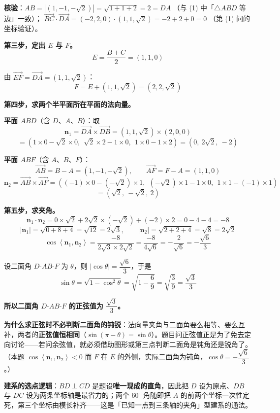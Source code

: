 \textbf{核验}：$AB=\left|\left(1,-1,-\sqrt2\right)\right|=\sqrt{1+1+2}=2=DA$ （与 (1) 中「$\triangle ABD$ 等边」一致）；
$\overrightarrow{BC}\cdot\overrightarrow{DA}=(-2,2,0)\cdot\left(1,1,\sqrt2\right)=-2+2+0=0$ （第 (1) 问的坐标验证）。

\textbf{第三步，定出 $E$ 与 $F$。}
\[E=\frac{B+C}2=(1,1,0)\]

由 $\overrightarrow{EF}=\overrightarrow{DA}=\left(1,1,\sqrt2\right)$：
\[F=E+\left(1,1,\sqrt2\right)=\left(2,2,\sqrt2\right)\]

\textbf{第四步，求两个半平面所在平面的法向量。}

\textbf{平面 $ABD$}（含 $D$、$A$、$B$）：取
\[\boldsymbol n_1=\overrightarrow{DA}\times\overrightarrow{DB}=\left(1,1,\sqrt2\right)\times(2,0,0)\]
\[=\left(1\times0-\sqrt2\times0,\ \ \sqrt2\times2-1\times0,\ \ 1\times0-1\times2\right)=\left(0,\ 2\sqrt2,\ -2\right)\]

\textbf{平面 $ABF$}（含 $A$、$B$、$F$）：
\[\overrightarrow{AB}=B-A=\left(1,-1,-\sqrt2\right),\qquad \overrightarrow{AF}=F-A=(1,1,0)\]
\[\boldsymbol n_2=\overrightarrow{AB}\times\overrightarrow{AF}=\left((-1)\times0-\left(-\sqrt2\right)\times1,\ \ \left(-\sqrt2\right)\times1-1\times0,\ \ 1\times1-(-1)\times1\right)\]
\[=\left(\sqrt2,\ -\sqrt2,\ 2\right)\]

\textbf{第五步，求夹角。}
\[\boldsymbol n_1\cdot\boldsymbol n_2=0\times\sqrt2+2\sqrt2\times\left(-\sqrt2\right)+(-2)\times2=0-4-4=-8\]
\[\left|\boldsymbol n_1\right|=\sqrt{0+8+4}=\sqrt{12}=2\sqrt3,\qquad \left|\boldsymbol n_2\right|=\sqrt{2+2+4}=\sqrt8=2\sqrt2\]
\[\cos\left\langle\boldsymbol n_1,\boldsymbol n_2\right\rangle=\frac{-8}{2\sqrt3\times2\sqrt2}=\frac{-8}{4\sqrt6}=-\frac2{\sqrt6}=-\frac{\sqrt6}3\]

设二面角 $D\text{-}AB\text{-}F$ 为 $\theta$，则 $|\cos\theta|=\dfrac{\sqrt6}3$，于是
\[\sin\theta=\sqrt{1-\cos^{2}\theta}=\sqrt{1-\frac69}=\sqrt{\frac39}=\frac{\sqrt3}3\]

\textbf{所以二面角 $D\text{-}AB\text{-}F$ 的正弦值为 $\dfrac{\sqrt3}3$。}

\begin{gktip}
\textbf{为什么求正弦时不必判断二面角的钝锐}：法向量夹角与二面角要么相等、要么互补，两者的\textbf{正弦值恒相同}（$\sin(\pi-\theta)=\sin\theta$）。题目问正弦值正是为了免去定向讨论——若问余弦值，就必须借助图形或第三点判断二面角是钝角还是锐角了。（本题 $\cos\left\langle\boldsymbol n_1,\boldsymbol n_2\right\rangle<0$ 而 $F$ 在 $E$ 的外侧，实际二面角为钝角，$\cos\theta=-\dfrac{\sqrt6}3$。）

\textbf{建系的选点逻辑}：$BD\perp CD$ 是题设\textbf{唯一现成的直角}，因此把 $D$ 设为原点、$DB$ 与 $DC$ 设为两条坐标轴是最省力的；两个 $60^\circ$ 角随即把 $A$ 的前两个坐标一次性定死，第三个坐标由模长补齐——这是「已知一点到三条轴的夹角」型建系的通法。
\end{gktip}

